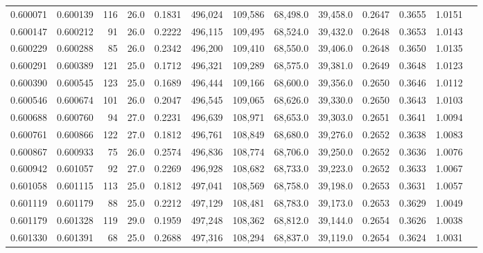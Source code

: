 \begin{tabular}{rrrrrrrrrrrrr}
0.600071 & 0.600139 &   116 & 26.0 &                                     0.1831 & 496,024 & 109,586 &  68,498.0 &  39,458.0 & 0.2647 & 0.3655 & 1.0151 \\
0.600147 & 0.600212 &    91 & 26.0 &                                     0.2222 & 496,115 & 109,495 &  68,524.0 &  39,432.0 & 0.2648 & 0.3653 & 1.0143 \\
0.600229 & 0.600288 &    85 & 26.0 &                                     0.2342 & 496,200 & 109,410 &  68,550.0 &  39,406.0 & 0.2648 & 0.3650 & 1.0135 \\
0.600291 & 0.600389 &   121 & 25.0 &                                     0.1712 & 496,321 & 109,289 &  68,575.0 &  39,381.0 & 0.2649 & 0.3648 & 1.0123 \\
0.600390 & 0.600545 &   123 & 25.0 &                                     0.1689 & 496,444 & 109,166 &  68,600.0 &  39,356.0 & 0.2650 & 0.3646 & 1.0112 \\
0.600546 & 0.600674 &   101 & 26.0 &                                     0.2047 & 496,545 & 109,065 &  68,626.0 &  39,330.0 & 0.2650 & 0.3643 & 1.0103 \\
0.600688 & 0.600760 &    94 & 27.0 &                                     0.2231 & 496,639 & 108,971 &  68,653.0 &  39,303.0 & 0.2651 & 0.3641 & 1.0094 \\
0.600761 & 0.600866 &   122 & 27.0 &                                     0.1812 & 496,761 & 108,849 &  68,680.0 &  39,276.0 & 0.2652 & 0.3638 & 1.0083 \\
0.600867 & 0.600933 &    75 & 26.0 &                                     0.2574 & 496,836 & 108,774 &  68,706.0 &  39,250.0 & 0.2652 & 0.3636 & 1.0076 \\
0.600942 & 0.601057 &    92 & 27.0 &                                     0.2269 & 496,928 & 108,682 &  68,733.0 &  39,223.0 & 0.2652 & 0.3633 & 1.0067 \\
0.601058 & 0.601115 &   113 & 25.0 &                                     0.1812 & 497,041 & 108,569 &  68,758.0 &  39,198.0 & 0.2653 & 0.3631 & 1.0057 \\
0.601119 & 0.601179 &    88 & 25.0 &                                     0.2212 & 497,129 & 108,481 &  68,783.0 &  39,173.0 & 0.2653 & 0.3629 & 1.0049 \\
0.601179 & 0.601328 &   119 & 29.0 &                                     0.1959 & 497,248 & 108,362 &  68,812.0 &  39,144.0 & 0.2654 & 0.3626 & 1.0038 \\
0.601330 & 0.601391 &    68 & 25.0 &                                     0.2688 & 497,316 & 108,294 &  68,837.0 &  39,119.0 & 0.2654 & 0.3624 & 1.0031 \\

\end{tabular}
